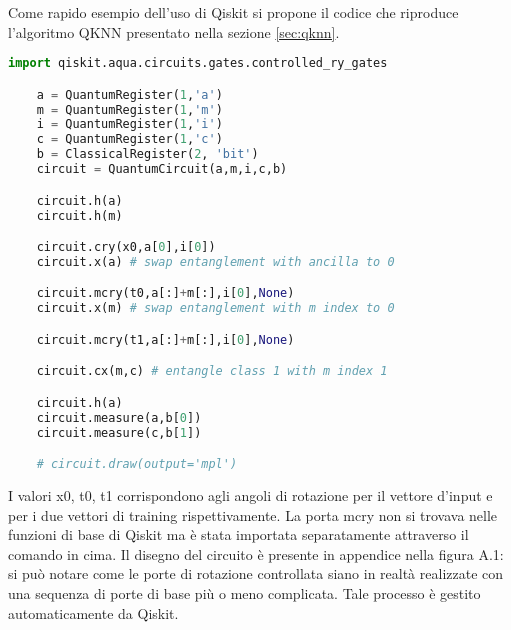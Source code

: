 Come rapido esempio dell'uso di Qiskit si propone il codice che riproduce 
l'algoritmo \ac{QKNN} presentato nella sezione \ref{sec:qknn}.

\begin{lstlisting}[float=h!,language=Python,frame=tb,caption={Algoritmo per il QKNN},label=lst:qknn]
    import qiskit.aqua.circuits.gates.controlled_ry_gates

    a = QuantumRegister(1,'a')
    m = QuantumRegister(1,'m')
    i = QuantumRegister(1,'i')
    c = QuantumRegister(1,'c')
    b = ClassicalRegister(2, 'bit')
    circuit = QuantumCircuit(a,m,i,c,b)

    circuit.h(a)
    circuit.h(m)

    circuit.cry(x0,a[0],i[0])
    circuit.x(a) # swap entanglement with ancilla to 0

    circuit.mcry(t0,a[:]+m[:],i[0],None)
    circuit.x(m) # swap entanglement with m index to 0

    circuit.mcry(t1,a[:]+m[:],i[0],None)

    circuit.cx(m,c) # entangle class 1 with m index 1

    circuit.h(a)
    circuit.measure(a,b[0])
    circuit.measure(c,b[1])

    # circuit.draw(output='mpl')
    \end{lstlisting}

    I valori x0, t0, t1 corrispondono agli angoli di rotazione per il vettore d'input e 
    per i due vettori di training rispettivamente. 
    La 
    porta mcry non si trovava nelle funzioni di base di Qiskit ma è stata importata 
    separatamente attraverso il comando in cima. 
    Il disegno del circuito è presente in appendice nella figura A.1: si può notare 
    come le porte di rotazione controllata siano in realtà realizzate con una sequenza 
    di porte di base più o meno complicata. Tale processo è gestito automaticamente 
    da Qiskit. 